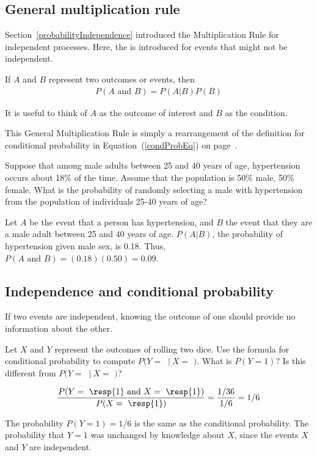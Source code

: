 \subsection{General multiplication rule}

Section~\ref{probabilityIndependence} introduced the Multiplication Rule for independent processes. Here, the  is introduced for events that might not be independent.

\begin{termBox}{
If $A$ and $B$ represent two outcomes or events, then \vspace{-1.5mm}
\begin{eqnarray*}
P(A\text{ and }B) = P(A | B) P(B)
\end{eqnarray*} \vspace{-6.5mm} \par
It is useful to think of $A$ as the outcome of interest and $B$ as the condition.}
\end{termBox}
This General Multiplication Rule is simply a rearrangement of the definition for conditional probability in Equation~(\ref{condProbEq}) on page~\pageref{condProbEq}.

\begin{example}
	{Suppose that among male adults between 25 and 40 years of age, hypertension occurs about 18\% of the time. Assume that the population is 50\% male, 50\% female. What is the probability of randomly selecting a male with hypertension from the population of individuals 25-40 years of age?} 
	
	Let $A$ be the event that a person has hypertension, and $B$ the event that they are a male adult between 25 and 40 years of age. $P(A|B)$, the probability of hypertension given male sex, is 0.18. Thus, $P(A \text{ and } B) = (0.18)(0.50) = 0.09$.
	
\end{example}


\subsection{Independence and conditional probability}

If two events are independent, knowing the outcome of one should provide no information about the other.  
\begin{example}
{Let $X$ and $Y$ represent the outcomes of rolling two dice. Use the formula for conditional probability to compute $P(Y =$ $\ |\ X = $ $)$. What is $P(Y=1)$? Is this different from $P(Y =$ $\ |\ X = $ $)$?}

\[\frac{P(Y = \text{ \resp{1} and }X=\text{ \resp{1}})}{P(X=\text{ \resp{1}})} = \frac{1/36}{1/6} = 1/6\]

The probability $P(Y=1) = 1/6$ is the same as the conditional probability. The probability that $Y=1$ was unchanged by knowledge about $X$, since the events $X$ and $Y$ are independent.

\label{condProbOfRollingA1AfterOne1}
\end{example}

